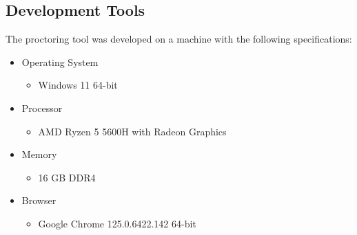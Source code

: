 \documentclass{icsthesis}
\begin{document}
\begin{mainmatter}
\subsection{Development Tools}
The proctoring tool was developed on a machine with the following specifications:
    \begin{itemize}
        \item Operating System
            \begin{itemize}
                \item Windows 11 64-bit
            \end{itemize}
        \item Processor
            \begin{itemize}
                \item AMD Ryzen 5 5600H with Radeon Graphics
            \end{itemize}
        \item Memory
            \begin{itemize}
                \item 16 GB DDR4
            \end{itemize}
        \item Browser
            \begin{itemize}
            \item Google Chrome 125.0.6422.142 64-bit
            \end{itemize}
    \end{itemize}


\end{mainmatter}
\end{document}
